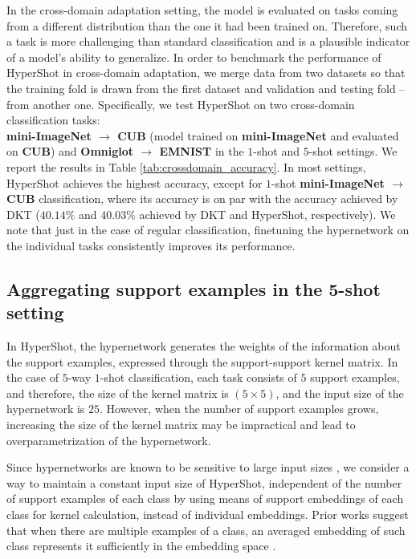 \documentclass[nohyperref]{article}
\def\our{HyperShot}
\theoremstyle{plain}
\theoremstyle{definition}
\theoremstyle{remark}
\begin{document}
In the cross-domain adaptation setting, the model is evaluated on tasks coming from a different distribution than the one it had been trained on. Therefore, such a task is more challenging than standard classification and is a plausible indicator of a model’s ability to generalize. In order to benchmark the performance of \our{} in cross-domain adaptation, we merge data from two datasets so that the training fold is drawn from the first dataset and validation and testing fold -- from another one. Specifically, we test \our{} on two cross-domain classification tasks: \\
\textbf{mini-ImageNet $\rightarrow$ CUB} (model trained on \textbf{mini-ImageNet} and evaluated on \textbf{CUB}) and \textbf{Omniglot $\rightarrow$ EMNIST} in the $1$-shot and $5$-shot settings. We report the results in Table \ref{tab:crossdomain_accuracy}. In most settings, \our{} achieves the highest accuracy, except for $1$-shot \textbf{mini-ImageNet $\rightarrow$ CUB} classification, where its accuracy is on par with the accuracy achieved by DKT \cite{patacchiola2020bayesian} ($40.14\%$ and $40.03\%$ achieved by DKT and \our{}, respectively). We note that just in the case of regular classification, finetuning the hypernetwork on the individual tasks consistently improves its performance.





\subsection{Aggregating support examples in the 5-shot setting}\label{sec:ablation}

In \our{}, the hypernetwork generates the weights of the information about the support examples, expressed through the support-support kernel matrix. In the case of $5$-way $1$-shot classification, each task consists of $5$ support examples, and therefore, the size of the kernel matrix is $(5 \times 5)$, and the input size of the hypernetwork is $25$. However, when the number of support examples grows, increasing the size of the kernel matrix may be impractical and lead to overparametrization of the hypernetwork. 

Since hypernetworks are known to be sensitive to large input sizes \cite{ha2016hypernetworks}, we consider a way to maintain a constant input size of \our{}, independent of the number of support examples of each class by using means of support embeddings of each class for kernel calculation, instead of individual embeddings. Prior works suggest that when there are multiple examples of a class, an averaged embedding of such class represents it sufficiently in the embedding space \cite{snell2017prototypical}. 
\end{document}
